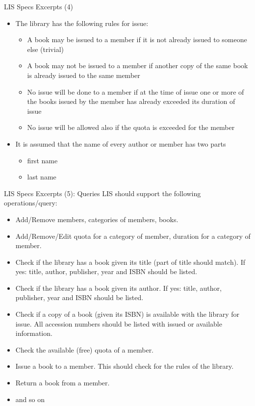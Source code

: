 \documentclass[aspectratio=169, xcolor=dvipsnames]{beamer}
\begin{document}
\begin{frame}{LIS Specs Excerpts (4)}
    \begin{itemize}[<+->]
        \item The library has the following rules for issue:
        \begin{itemize}
            \item[$\triangleright$] A book may be issued to a member if it is not already issued to someone else (trivial)
            \item[$\triangleright$] A book may not be issued to a member if another copy of the same book is already issued to the same member
            \item[$\triangleright$] No issue will be done to a member if at the time of issue one or more of the books issued by the member has already exceeded its duration of issue
            \item[$\triangleright$] No issue will be allowed also if the quota is exceeded for the member
        \end{itemize}
        \item It is assumed that the name of every author or member has two parts
        \begin{itemize}
            \item[$\triangleright$] first name
            \item[$\triangleright$] last name
        \end{itemize}
    \end{itemize}
\end{frame}

\begin{frame}{LIS Specs Excerpts (5): Queries}
    LIS should support the following operations/query:
    \begin{itemize}[<+->]
        \item Add/Remove members, categories of members, books.
        \item Add/Remove/Edit quota for a category of member, duration for a category of member.
        \item Check if the library has a book given its title (part of title should match). If yes: title, author, publisher, year and ISBN should be listed.
        \item Check if the library has a book given its author. If yes: title, author, publisher, year and ISBN should be listed.
        \item Check if a copy of a book (given its ISBN) is available with the library for issue. All accession numbers should be listed with issued or available information.
        \item Check the available (free) quota of a member.
        \item Issue a book to a member. This should check for the rules of the library.
        \item Return a book from a member.
        \item and so on
    \end{itemize}
\end{frame}
\end{document}
